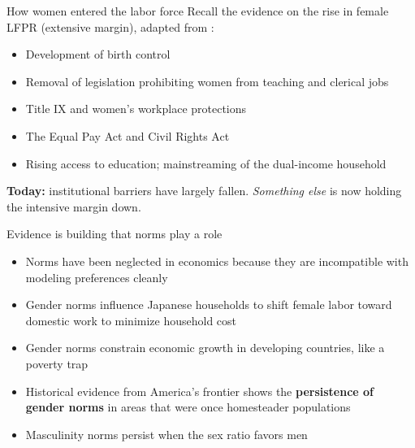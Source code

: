 \documentclass[10pt,aspectratio=169]{beamer}
\begin{document}
\begin{frame}{How women entered the labor force}
  Recall the evidence on the rise in female LFPR (extensive margin),
  adapted from \citet{Goldin1992, Goldin2023}:
  \begin{itemize}
    \item Development of birth control
    \item Removal of legislation prohibiting women from teaching and clerical jobs
    \item Title IX and women's workplace protections
    \item The Equal Pay Act and Civil Rights Act
    \item Rising access to education; mainstreaming of the dual-income household
  \end{itemize}
  \medskip
  \textbf{Today:} institutional barriers have largely fallen.
  \textit{Something else} is now holding the intensive margin down.
\end{frame}

\begin{frame}{Evidence is building that norms play a role}
  \begin{itemize}
    \item[$\Rightarrow$] Norms have been neglected in economics because they are
          incompatible with modeling preferences cleanly \citep{Lundberg2025}
    \item[$\Rightarrow$] Gender norms influence Japanese households to shift female
          labor toward domestic work to minimize household cost
          \citep{SakamotoKohara2025}
    \item[$\Rightarrow$] Gender norms constrain economic growth in developing
          countries, like a poverty trap \citep{Fieldetal2026}
    \item[$\Rightarrow$] Historical evidence from America's frontier shows the
          \textbf{persistence of gender norms} in areas that were once
          homesteader populations \citep{Bazzietal2025}
    \item[$\Rightarrow$] Masculinity norms persist when the sex ratio favors men
          \citep{Baranovetal2023}
  \end{itemize}
\end{frame}
\end{document}
